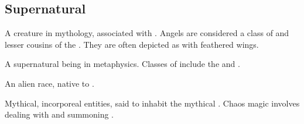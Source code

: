 \subsection{Supernatural}
\begin{gloss}







\begin{comment}
\paragraph{angel}
\end{comment}
A creature in  mythology, associated with \iquin. 
Angels are considered a class of  and lesser cousins of the . 
They are often depicted as  with feathered wings. 







\begin{comment}
\paragraph{\Archon}
\end{comment}
\gitem{\Archon}
A supernatural being in  metaphysics. %
Classes of \Archons{} include the  and . 







\begin{comment}
\paragraph{\bane}
\end{comment}
\gitem[\banes]{\bane}
An alien race, native to . 








\begin{comment}
\paragraph{\daemon}
\end{comment}
\gitem[\daemons]{\daemon}
Mythical, incorporeal entities, said to inhabit the mythical . 
Chaos magic involves dealing with and summoning \daemons. 








\end{gloss}
